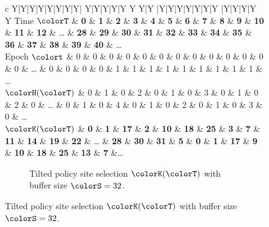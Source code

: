 \begin{figure}[htbp!]
  \centering

\begin{minipage}{\textwidth}
  \scriptsize
  \setlength{\tabcolsep}{2.5pt}
  \begin{tabularx}{\textwidth}{
    c
    Y|Y|Y|Y|Y|Y|Y|Y|
    Y|Y|Y|Y|Y Y Y|Y
    |Y|Y|Y|Y|Y|Y|Y
    |Y|Y|Y|Y Y
    }
     { Time $\colorT$} & \textbf{0} & \textbf{1} & \textbf{2} & \textbf{3} & \textbf{4} & \textbf{5} & \textbf{6} & \textbf{7}
    & \textbf{8} & \textbf{9} & \textbf{10} & \textbf{11} & \textbf{12} %
    &  \ldots
    & \textbf{28} & \textbf{29} & \textbf{30} & \textbf{31}
    & \textbf{32} & \textbf{33} & \textbf{34} & \textbf{35}
    & \textbf{36} & \textbf{37} & \textbf{38} & \textbf{39} & \textbf{40}
    & \ldots \\
   { Epoch $\colort$} & 0 & 0 & 0 & 0 & 0 & 0 & 0 & 0
    & 0 & 0 & 0 & 0 & 0 %
    &  \ldots
    & 0 & 0 & 0 & 0
    & 1 & 1 & 1 & 1
    & 1 & 1 & 1 & 1 & 1
    & \ldots \\
    { \scriptsize$\colorH(\colorT)$} & 0 & 1 & 0 & 2 & 0 & 1 & 0 & 3
    & 0 & 1 & 0 & 2 & 0 %
    &  \ldots
    & 0 & 1 & 0 & 4
    & 0 & 1 & 0 & 2
    & 0 & 1 & 0 & 3 & 0
    & \ldots \\
     { \scriptsize $\colorK(\colorT)$} & \textbf{0} & \textbf{1} & \textbf{17} & \textbf{2} & \textbf{10} & \textbf{18} & \textbf{25} & \textbf{3}
     & \textbf{7} & \textbf{11} & \textbf{14} & \textbf{19} & \textbf{22} & \ldots
 & \textbf{28} & \textbf{30} & \textbf{31} & \textbf{5} & \textbf{0}
 & \textbf{1} & \textbf{17} & \textbf{9} & \textbf{10}
 & \textbf{18} & \textbf{25} & \textbf{13} & \textbf{7}  &\ldots
  \end{tabularx}
\end{minipage}
\begin{subfigure}{\textwidth}
\vspace{-1ex}
\caption{\footnotesize Tilted policy site selection $\colorK(\colorT)$ with buffer size $\colorS=32$.}
\label{fig:hsurf-tilted-implementation-site-selection}
\end{subfigure}


\end{figure}
